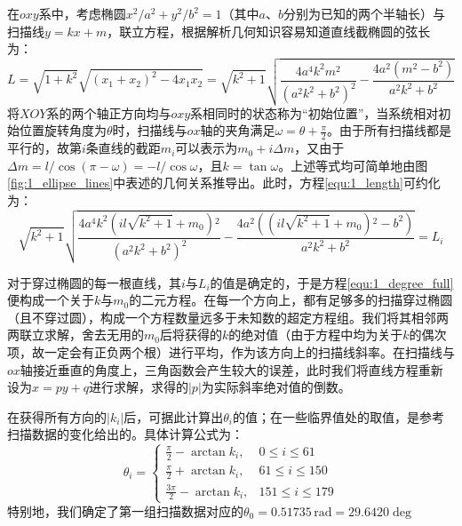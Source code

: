 在$oxy$系中，考虑椭圆$x^2/a^2+y^2/b^2=1$（其中$a$、$b$分别为已知的两个半轴长）与扫描线$y=kx+m$，联立方程，根据解析几何知识容易知道直线截椭圆的弦长为：
\begin{equation}\label{equ:1_length}
  L = \sqrt{1+k^2}\sqrt{(x_1+x_2)^2-4 x_1 x_2} = \sqrt{k^2+1} \sqrt{\frac{4 a^4 k^2 m^2}{\left(a^2 k^2+b^2\right)^2}-\frac{4 a^2 \left(m^2-b^2\right)}{a^2 k^2+b^2}}
\end{equation}
将$XOY$系的两个轴正方向均与$oxy$系相同时的状态称为“初始位置”，当系统相对初始位置旋转角度为$\theta$时，扫描线与$ox$轴的夹角满足$\omega = \theta + \frac{\pi}{2}$。由于所有扫描线都是平行的，故第$i$条直线的截距$m_i$可以表示为$m_0+i\Delta m$，又由于$\Delta m = l / \cos(\pi-\omega) = -l/\cos\omega$，且$k=\tan\omega$。上述等式均可简单地由图\ref{fig:1_ellipse_lines}中表述的几何关系推导出。此时，方程\ref{equ:1_length}可约化为：
\begin{equation}\label{equ:1_degree_full}
  \sqrt{k^2+1} \sqrt{\frac{4 a^4 k^2 \left(i l \sqrt{k^2+1} +m_0\right){}^2}{\left(a^2 k^2+b^2\right)^2}-\frac{4 a^2 \left(\left(i l \sqrt{k^2+1} +m_0\right){}^2-b^2\right)}{a^2 k^2+b^2}}=L_i
\end{equation}

对于穿过椭圆的每一根直线，其$i$与$L_i$的值是确定的，于是方程\ref{equ:1_degree_full}便构成一个关于$k$与$m_0$的二元方程。在每一个方向上，都有足够多的扫描穿过椭圆（且不穿过圆），构成一个方程数量远多于未知数的超定方程组。我们将其相邻两两联立求解，舍去无用的$m_0$后将获得的$k$的绝对值（由于方程中均为关于$k$的偶次项，故一定会有正负两个根）进行平均，作为该方向上的扫描线斜率。在扫描线与$ox$轴接近垂直的角度上，三角函数会产生较大的误差，此时我们将直线方程重新设为$x=py+q$进行求解，求得的$|p|$为实际斜率绝对值的倒数。

在获得所有方向的$|k_i|$后，可据此计算出$\theta_i$的值；在一些临界值处的取值，是参考扫描数据的变化给出的。具体计算公式为：
\begin{equation}\label{equ:1_k_to_theta}
  \theta_i=
  \begin{cases}
    \frac{\pi}{2}-\arctan k_i, &  0 \leq i \leq 61 \\
    \frac{\pi}{2}+\arctan k_i, &  61 \leq i \leq 150 \\
    \frac{3\pi}{2}-\arctan k_i, & 151 \leq i \leq 179
  \end{cases}
\end{equation}
特别地，我们确定了第一组扫描数据对应的$\theta_0 = 0.51735\,\mathrm{rad} = 29.6420 \deg$

